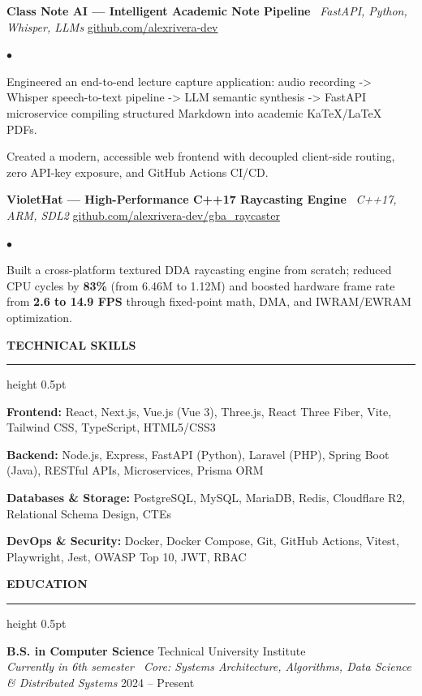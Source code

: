 \documentclass[10pt,letterpaper]{article}
\newcommand{\resumesection}[1]{%
  \vspace{2pt}%
  {\color{primary}\normalsize\bfseries\MakeUppercase{#1}}%
  \vspace{1pt}\hrule height 0.5pt\vspace{2pt}%
}
\renewenvironment{itemize}{%
  \begin{list}{\color{primary}$\bullet$}{%
    \setlength{\leftmargin}{1.1em}%
    \setlength{\itemsep}{0.5pt}%
    \setlength{\topsep}{1pt}%
    \setlength{\parsep}{0pt}%
    \setlength{\partopsep}{0pt}%
  }%
}{%
  \end{list}%
}
\newenvironment{skilllist}{%
  \begin{list}{}{%
    \setlength{\leftmargin}{0pt}%
    \setlength{\itemsep}{0.5pt}%
    \setlength{\topsep}{1pt}%
    \setlength{\parsep}{0pt}%
    \setlength{\partopsep}{0pt}%
  }%
}{%
  \end{list}%
}
\begin{document}
\vspace{1pt}

\textbf{Class Note AI — Intelligent Academic Note Pipeline} \textbar\ \textit{FastAPI, Python, Whisper, LLMs} \hfill \href{https://github.com/alexrivera-dev}{github.com/alexrivera-dev}
\begin{itemize}
    \item Engineered an end-to-end lecture capture application: audio recording -> Whisper speech-to-text pipeline -> LLM semantic synthesis -> FastAPI microservice compiling structured Markdown into academic KaTeX/LaTeX PDFs.
    \item Created a modern, accessible web frontend with decoupled client-side routing, zero API-key exposure, and GitHub Actions CI/CD.
\end{itemize}

\vspace{1pt}

\textbf{VioletHat — High-Performance C++17 Raycasting Engine} \textbar\ \textit{C++17, ARM, SDL2} \hfill \href{https://github.com/alexrivera-dev/gba_raycaster}{github.com/alexrivera-dev/gba\_raycaster}
\begin{itemize}
    \item Built a cross-platform textured DDA raycasting engine from scratch; reduced CPU cycles by \textbf{83\%} (from 6.46M to 1.12M) and boosted hardware frame rate from \textbf{2.6 to 14.9 FPS} through fixed-point math, DMA, and IWRAM/EWRAM optimization.
\end{itemize}

\resumesection{Technical Skills}
\begin{skilllist}
    \item \textbf{Frontend:} React, Next.js, Vue.js (Vue 3), Three.js, React Three Fiber, Vite, Tailwind CSS, TypeScript, HTML5/CSS3
    \item \textbf{Backend:} Node.js, Express, FastAPI (Python), Laravel (PHP), Spring Boot (Java), RESTful APIs, Microservices, Prisma ORM
    \item \textbf{Databases \& Storage:} PostgreSQL, MySQL, MariaDB, Redis, Cloudflare R2, Relational Schema Design, CTEs
    \item \textbf{DevOps \& Security:} Docker, Docker Compose, Git, GitHub Actions, Vitest, Playwright, Jest, OWASP Top 10, JWT, RBAC
\end{skilllist}

\resumesection{Education}
\textbf{B.S. in Computer Science} \hfill Technical University Institute \\
\textit{Currently in 6th semester \textbar\ Core: Systems Architecture, Algorithms, Data Science \& Distributed Systems} \hfill 2024 -- Present
\end{document}
